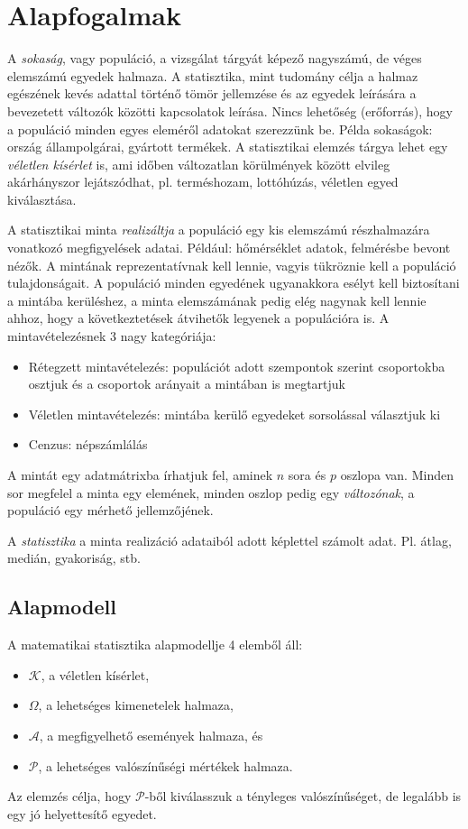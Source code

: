 \chapter{Alapfogalmak}

A \emph{sokaság}, vagy populáció, a vizsgálat tárgyát képező nagyszámú, de véges elemszámú egyedek halmaza. A statisztika, mint tudomány célja a halmaz egészének kevés adattal történő tömör jellemzése és az egyedek leírására a bevezetett változók közötti kapcsolatok leírása. Nincs lehetőség (erőforrás), hogy a populáció minden egyes eleméről adatokat szerezzünk be. Példa sokaságok: ország állampolgárai, gyártott termékek. A statisztikai elemzés tárgya lehet egy \emph{véletlen kísérlet} is, ami időben változatlan körülmények között elvileg akárhányszor lejátszódhat, pl. terméshozam, lottóhúzás, véletlen egyed kiválasztása.

A statisztikai minta \emph{realizáltja} a populáció egy kis elemszámú részhalmazára vonatkozó megfigyelések adatai. Például: hőmérséklet adatok, felmérésbe bevont nézők. A mintának reprezentatívnak kell lennie, vagyis tükröznie kell a populáció tulajdonságait. A populáció minden egyedének ugyanakkora esélyt kell biztosítani a mintába kerüléshez, a minta elemszámának pedig elég nagynak kell lennie ahhoz, hogy a következtetések átvihetők legyenek a populációra is. A mintavételezésnek 3 nagy kategóriája:
\begin{itemize}
\item Rétegzett mintavételezés: populációt adott szempontok szerint csoportokba osztjuk és a csoportok arányait a mintában is megtartjuk
\item Véletlen mintavételezés: mintába kerülő egyedeket sorsolással választjuk ki
\item Cenzus: népszámlálás
\end{itemize}
A mintát egy adatmátrixba írhatjuk fel, aminek $n$ sora és $p$ oszlopa van. Minden sor megfelel a minta egy elemének, minden oszlop pedig egy \emph{változónak}, a populáció egy mérhető jellemzőjének. 

A \emph{statisztika} a minta realizáció adataiból adott képlettel számolt adat. Pl. átlag, medián, gyakoriság, stb.

\section{Alapmodell}

A matematikai statisztika alapmodellje 4 elemből áll:
\begin{itemize}
\item $\mathcal{K}$, a véletlen kísérlet,
\item $\Omega$, a lehetséges kimenetelek halmaza,
\item $\mathcal{A}$, a megfigyelhető események halmaza, és 
\item $\mathcal{P}$, a lehetséges valószínűségi mértékek halmaza.
\end{itemize}
Az elemzés célja, hogy $\mathcal{P}$-ből kiválasszuk a tényleges valószínűséget, de legalább is egy jó helyettesítő egyedet.

